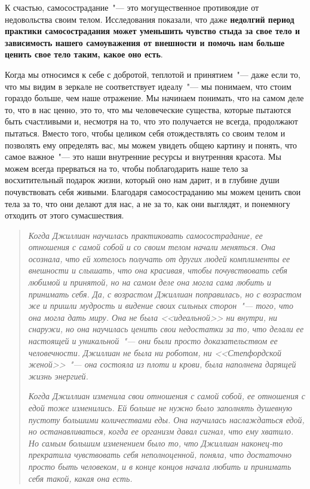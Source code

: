 К счастью, самосострадание~"--- это могущественное противоядие от недовольства своим телом. Исследования показали, что даже \textbf{недолгий период практики самосострадания может уменьшить чувство стыда за свое тело и зависимость нашего самоуважения от внешности и помочь нам больше ценить свое тело таким, какое оно есть}\cite{78,79}. 

Когда мы относимся к себе с добротой, теплотой и принятием~"--- даже если то, что мы видим в зеркале не соответствует идеалу~"--- мы понимаем, что стоим гораздо больше, чем наше отражение. Мы начинаем понимать, что на самом деле то, что в нас ценно, это то, что мы человеческие существа, которые пытаются быть счастливыми и, несмотря на то, что это получается не всегда, продолжают пытаться. Вместо того, чтобы целиком себя отождествлять со своим телом и позволять ему определять вас, мы можем увидеть общею картину и понять, что самое важное~"--- это наши внутренние ресурсы и внутренняя красота. Мы можем всегда прерваться на то, чтобы поблагодарить наше тело за восхитительный подарок жизни, который оно нам дарит, и в глубине души почувствовать себя живыми. Благодаря самосостраданию мы можем ценить свои тела за то, что они делают для нас, а не за то, как они выглядят, и понемногу отходить от этого сумасшествия.  

\begin{quotation}
	\textit{
		Когда Джиллиан научилась практиковать самосострадание, ее отношения с самой собой и со своим телом начали меняться. Она осознала, что ей хотелось получать от других людей комплименты ее внешности и слышать, что она красивая, чтобы почувствовать себя любимой и принятой, но на самом деле она могла сама любить и принимать себя. Да, с возрастом Джиллиан поправилась, но с возрастом же и пришли мудрость и видение своих сильных сторон~"--- того, что она могла дать миру. Она не была <<идеальной>> ни внутри, ни снаружи, но она научилась ценить свои недостатки за то, что делали ее настоящей и уникальной~"--- они были просто доказательством ее человечности. Джиллиан не была ни роботом, ни <<Степфордской женой>>~"--- она состояла из плоти и крови, была наполнена дарящей жизнь энергией.
	}
	
	\textit{
		Когда Джиллиан изменила свои отношения с самой собой, ее отношения с едой тоже изменились. Ей больше не нужно было заполнять душевную пустоту большими количествами еды. Она научилась наслаждаться едой, но останавливаться, когда ее организм давал сигнал, что ему хватило. Но самым большим изменением было то, что Джиллиан наконец-то прекратила чувствовать себя неполноценной, поняла, что достаточно просто быть человеком, и в конце концов начала любить и принимать себя такой, какая она есть.
	}
\end{quotation}

